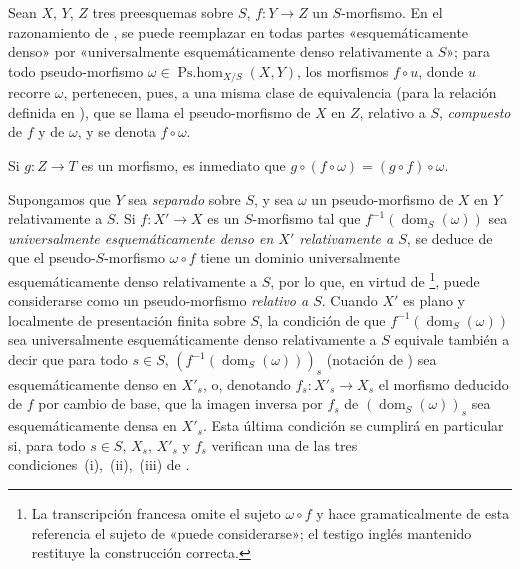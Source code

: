 \begin{env}[20.5.5]
\label{IV.20.5.5}
Sean $X$, $Y$, $Z$ tres preesquemas sobre $S$, $f:Y\to Z$ un $S$-morfismo.
En el razonamiento de , se puede reemplazar en todas partes «esquemáticamente denso» por «universalmente esquemáticamente denso relativamente a $S$»; para todo pseudo-morfismo $\omega\in\operatorname{Ps.hom}_{X/S}(X,Y)$, los morfismos $f\circ u$, donde $u$ recorre $\omega$, pertenecen, pues, a una misma clase de equivalencia (para la relación definida en ), que 
se llama el pseudo-morfismo de $X$ en $Z$, relativo a $S$, \emph{compuesto} de $f$ y de $\omega$, y se denota $f\circ\omega$.

Si $g:Z\to T$ es un morfismo, es inmediato que $g\circ(f\circ\omega)=(g\circ f)\circ\omega$.
\end{env}

\begin{env}[20.5.6]
\label{IV.20.5.6}
Supongamos que $Y$ sea \emph{separado} sobre $S$, y sea $\omega$ un pseudo-morfismo de $X$ en $Y$ relativamente a $S$.
Si $f:X'\to X$ es un $S$-morfismo tal que $f^{-1}(\operatorname{dom}_S(\omega))$ sea \emph{universalmente esquemáticamente denso en $X'$ relativamente a $S$}, se deduce de  que el pseudo-$S$-morfismo $\omega\circ f$ tiene un dominio universalmente esquemáticamente denso relativamente a $S$, por lo que, en virtud de \footnote{La transcripción francesa omite el sujeto $\omega\circ f$ y hace gramaticalmente de esta referencia el sujeto de «puede considerarse»; el testigo inglés mantenido restituye la construcción correcta.}, puede considerarse como un pseudo-morfismo \emph{relativo a $S$}.
Cuando $X'$ es plano y localmente de presentación finita sobre $S$, la condición de que $f^{-1}(\operatorname{dom}_S(\omega))$ sea universalmente esquemáticamente denso relativamente a $S$ equivale también a decir que para todo $s\in S$, $(f^{-1}(\operatorname{dom}_S(\omega)))_s$ (notación de ) sea esquemáticamente denso en $X'_s$, o, denotando $f_s:X'_s\to X_s$ el morfismo deducido de $f$ por cambio de base, que la imagen inversa por $f_s$ de $(\operatorname{dom}_S(\omega))_s$ sea esquemáticamente densa en $X'_s$.
Esta última condición se cumplirá en particular si, para todo $s\in S$, $X_s$, $X'_s$ y $f_s$ verifican una de las tres condiciones~(i),~(ii),~(iii) de .
\end{env}

